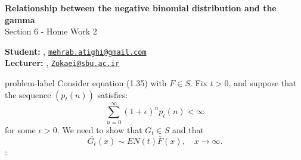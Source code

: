 	






		\begin{Large}
		\textsf{\textbf{Relationship between the negative binomial distribution and the gamma}}\\
		Section 6 - Home Work 2
	\end{Large}
	
	\vspace{1ex}
	
	\textsf{\textbf{Student:}} , \href{mailto:mehrab.atighi@gmail.com}{\texttt{mehrab.atighi@gmail.com}}\\
	\textsf{\textbf{Lecturer:}} , \href{mailto:Zokaei@sbu.ac.ir}{\texttt{Zokaei@sbu.ac.ir}}
	
	
	\vspace{2ex}
	
	\begin{problem}{}{problem-label}
		Consider equation (1.35) with $F \in S$. Fix $t > 0$, and suppose that the sequence $(p_t(n))$ satisfies:
		\[
		\sum_{n=0}^{\infty} (1 + \epsilon)^n p_t(n) < \infty
		\]
		for some $\epsilon > 0$. We need to show that $G_t \in S$ and that
		\[
		\overline{G_t}(x) \sim EN(t) \overline{F}(x), \quad x \to \infty.
		\]\cite{Embrechts.etal1997}:
	\end{problem}
	
